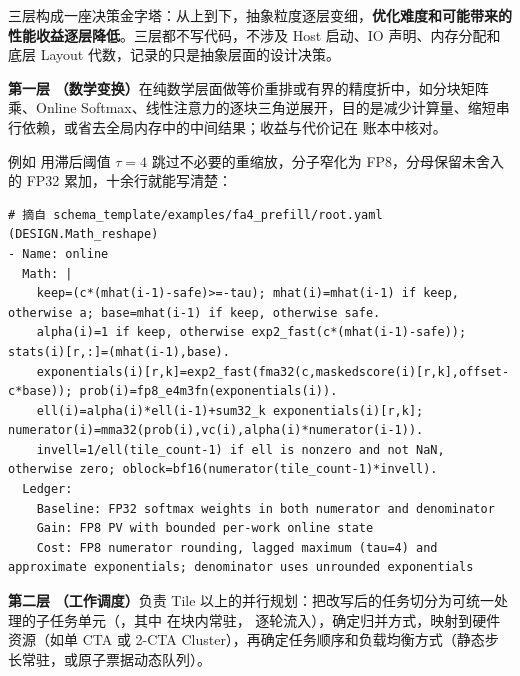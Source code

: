 \begin{DiagramBlock}
\end{DiagramBlock}
三层构成一座决策金字塔：从上到下，抽象粒度逐层变细，\textbf{优化难度和可能带来的性能收益逐层降低}。三层都不写代码，不涉及 Host 启动、IO 声明、内存分配和底层 Layout 代数，记录的只是抽象层面的设计决策。


\textbf{第一层} \textbf{（数学变换）}在纯数学层面做等价重排或有界的精度折中，如分块矩阵乘、Online Softmax、线性注意力的逐块三角逆展开，目的是减少计算量、缩短串行依赖，或省去全局内存中的中间结果；收益与代价记在  账本中核对。

例如  用滞后阈值 $\tau=4$ 跳过不必要的重缩放，分子窄化为 FP8，分母保留未舍入的 FP32 累加，十余行就能写清楚：
\begin{CodeBox}
\begin{Verbatim}[breaklines,breakanywhere,breaksymbolleft={},breaksymbolright={},breakautoindent=true]
# 摘自 schema_template/examples/fa4_prefill/root.yaml (DESIGN.Math_reshape)
- Name: online
  Math: |
    keep=(c*(mhat(i-1)-safe)>=-tau); mhat(i)=mhat(i-1) if keep, otherwise a; base=mhat(i-1) if keep, otherwise safe.
    alpha(i)=1 if keep, otherwise exp2_fast(c*(mhat(i-1)-safe)); stats(i)[r,:]=(mhat(i-1),base).
    exponentials(i)[r,k]=exp2_fast(fma32(c,maskedscore(i)[r,k],offset-c*base)); prob(i)=fp8_e4m3fn(exponentials(i)).
    ell(i)=alpha(i)*ell(i-1)+sum32_k exponentials(i)[r,k]; numerator(i)=mma32(prob(i),vc(i),alpha(i)*numerator(i-1)).
    invell=1/ell(tile_count-1) if ell is nonzero and not NaN, otherwise zero; oblock=bf16(numerator(tile_count-1)*invell).
  Ledger:
    Baseline: FP32 softmax weights in both numerator and denominator
    Gain: FP8 PV with bounded per-work online state
    Cost: FP8 numerator rounding, lagged maximum (tau=4) and approximate exponentials; denominator uses unrounded exponentials
\end{Verbatim}
\end{CodeBox}

\textbf{第二层} \textbf{（工作调度）}负责 Tile 以上的并行规划：把改写后的任务切分为可统一处理的子任务单元（，其中  在块内常驻， 逐轮流入），确定归并方式，映射到硬件资源（如单 CTA 或 2-CTA Cluster），再确定任务顺序和负载均衡方式（静态步长常驻，或原子票据动态队列）。

